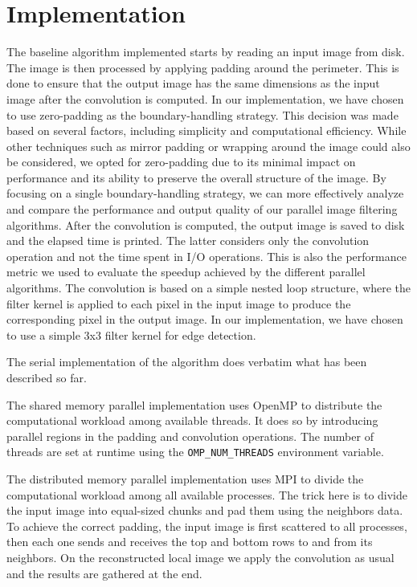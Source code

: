 \section{Implementation}

The baseline algorithm implemented starts by reading an input image from disk. The %
image is then processed by applying padding around the perimeter. This is done to %
ensure that the output image has the same dimensions as the input image after the %
convolution is computed. In our implementation, we have chosen to use zero-padding %
as the boundary-handling strategy. This decision was made based on several factors, %
including simplicity and computational efficiency. While other techniques such as %
mirror padding or wrapping around the image could also be considered, we opted %
for zero-padding due to its minimal impact on performance and its ability to %
preserve the overall structure of the image. By focusing on a single boundary-handling %
strategy, we can more effectively analyze and compare the performance and output %
quality of our parallel image filtering algorithms.
After the convolution is computed, the output image is saved to disk and the elapsed %
time is printed. The latter considers only the convolution operation %
and not the time spent in I/O operations. This is also the performance metric %
we used to evaluate the speedup achieved by the different parallel algorithms. %
The convolution is based on a simple nested loop structure, %
where the filter kernel is applied to each pixel in the input image to produce the %
corresponding pixel in the output image. In our implementation, %
we have chosen to use a simple 3x3 filter kernel for edge detection. 

The serial implementation of the algorithm does verbatim what has been described so far. 

The shared memory parallel implementation uses OpenMP to distribute the computational %
workload among available threads. It does so by introducing parallel regions in the %
padding and convolution operations. The number of threads are set at runtime using the %
\texttt{OMP\_NUM\_THREADS} environment variable.

The distributed memory parallel implementation uses MPI to divide the computational %
workload among all available processes. The trick here is to divide the input image into %
equal-sized chunks and pad them using the neighbors data. To achieve the correct %
padding, the input image is first scattered to all processes, then each one sends %
and receives the top and bottom rows to and from its neighbors. On the reconstructed %
local image we apply the convolution as usual and the results are gathered at the end. 

